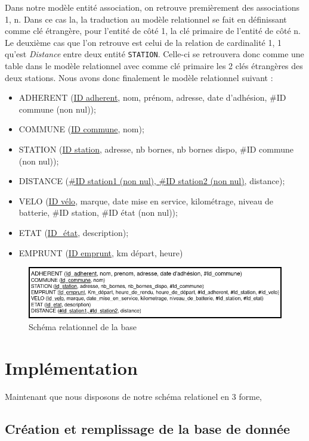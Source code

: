 \documentclass[10pt]{article}
\begin{document}
  Dans notre modèle entité association, on retrouve premièrement des associations 1, n.
  Dans ce cas la, la traduction au modèle relationnel se fait en définissant comme clé étrangère, pour l'entité de côté 1,
  la clé primaire de l'entité de côté n.
  Le deuxième cas que l'on retrouve est celui de la relation de cardinalité 1, 1 qu'est \textit{Distance} entre deux entité \texttt{STATION}.
  Celle-ci se retrouvera donc comme une table dans le modèle relationnel avec comme clé primaire les 2 clés étrangères des
  deux stations.
  Nous avons donc finalement le modèle relationnel suivant :\\
  \begin{itemize}
    \item ADHERENT (\underline{ID adherent}, nom, prénom, adresse, date d'adhésion, #ID commune (non nul));
    \item COMMUNE (\underline{ID commune}, nom);
    \item STATION (\underline{ID station}, adresse, nb bornes, nb bornes dispo, #ID commune (non nul));
    \item DISTANCE (\underline{#ID station1 (non nul), #ID station2 (non nul)}, distance);
    \item VELO (\underline{ID vélo}, marque, date mise en service, kilométrage, niveau de batterie, #ID station, #ID état (non nul));
    \item ETAT (\underline{ID_état}, description);
    \item EMPRUNT (\underline{ID emprunt}, km départ, heure)
  \end{itemize}
  \begin{figure}[!h]
    \centering
    \includegraphics[scale=0.5]{img/schema_relationel}
    \caption{Schéma relationnel de la base}
    \label{fig:relat}
  \end{figure}

  \section{Implémentation}\label{sec:implementation}
  Maintenant que nous disposons de notre schéma relationel en 3\ieme{} forme,
  \subsection{Création et remplissage de la base de donnée}\label{subsec:crea}
\end{document}
